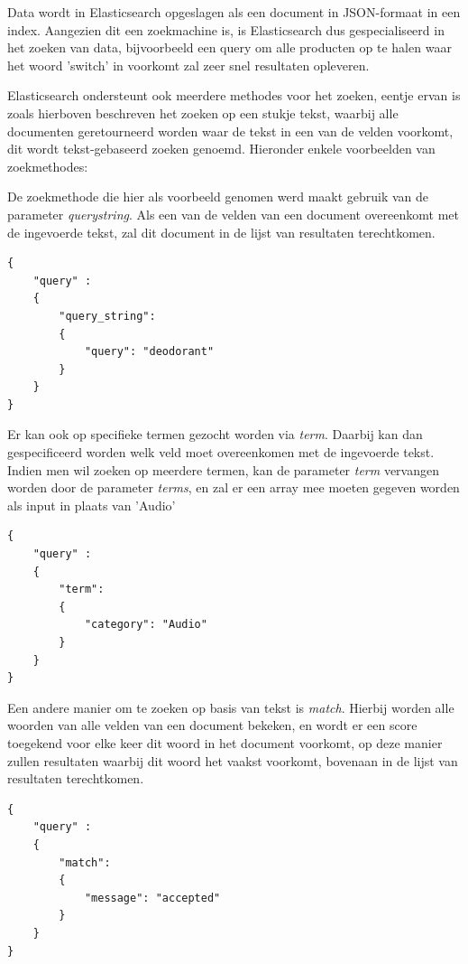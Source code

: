 Data wordt in Elasticsearch opgeslagen als een document in JSON-formaat in een index. Aangezien dit een zoekmachine is, is Elasticsearch dus gespecialiseerd in het zoeken van data, bijvoorbeeld een query om alle producten op te halen waar het woord 'switch' in voorkomt zal zeer snel resultaten opleveren.  

Elasticsearch ondersteunt ook meerdere methodes voor het zoeken, eentje ervan is zoals hierboven beschreven het zoeken op een stukje tekst, waarbij alle documenten geretourneerd worden waar de tekst in een van de velden voorkomt, dit wordt tekst-gebaseerd zoeken genoemd.  Hieronder enkele voorbeelden van zoekmethodes:  

De zoekmethode die hier als voorbeeld genomen werd maakt gebruik van de parameter \textit{query\textunderscore string}. Als een van de velden van een document overeenkomt met de ingevoerde tekst, zal dit document in de lijst van resultaten terechtkomen.

\begin{lstlisting}[caption={Tekst-gebaseerd zoeken: Query om een simpele zoekopdracht uit te voeren met de term 'deodorant'}]
{
	"query" : 
	{
		"query_string": 
		{
			"query": "deodorant"
		}
	}
}
\end{lstlisting}

\newpage
Er kan ook op specifieke termen gezocht worden via \textit{term}. Daarbij kan dan gespecificeerd worden welk veld moet overeenkomen met de ingevoerde tekst. 
Indien men wil zoeken op meerdere termen, kan de parameter \textit{term} vervangen worden door de parameter \textit{terms}, en zal er een array mee moeten gegeven worden als input in plaats van 'Audio' 

\begin{lstlisting}[caption={Tekst-gebaseerd zoeken: Query om een simpele zoekopdracht uit te voeren waar de categorie van het product overeen komt met 'Audio' }]
{
	"query" : 
	{
		"term": 
		{
			"category": "Audio"
		}
	}
}
\end{lstlisting}

Een andere manier om te zoeken op basis van tekst is \textit{match}. Hierbij worden alle woorden van alle velden van een document bekeken, en wordt er een score toegekend voor elke keer dit woord in het document voorkomt, op deze manier zullen resultaten waarbij dit woord het vaakst voorkomt, bovenaan in de lijst van resultaten terechtkomen. 

\begin{lstlisting}[caption={Tekst-gebaseerd zoeken: Query die de resultaten sorteert op basis van hoe vaak het woord 'accepted' voorkomt in het veld 'message' van een document }]
{
	"query" : 
	{
		"match": 
		{
			"message": "accepted"
		}
	}
}
\end{lstlisting}

